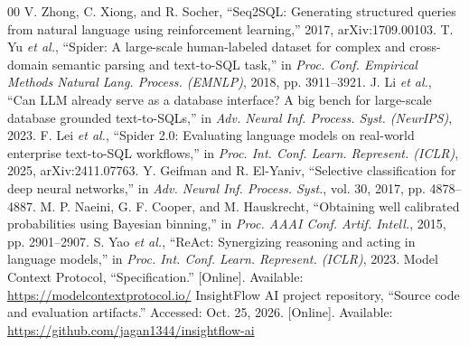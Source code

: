 \documentclass[conference]{IEEEtran}
\begin{document}
\begin{thebibliography}{00}
 V. Zhong, C. Xiong, and R. Socher, ``Seq2SQL: Generating structured queries from natural language using reinforcement learning,'' 2017, arXiv:1709.00103.
 T. Yu \emph{et al.}, ``Spider: A large-scale human-labeled dataset for complex and cross-domain semantic parsing and text-to-SQL task,'' in \emph{Proc. Conf. Empirical Methods Natural Lang. Process. (EMNLP)}, 2018, pp. 3911--3921.
 J. Li \emph{et al.}, ``Can LLM already serve as a database interface? A big bench for large-scale database grounded text-to-SQLs,'' in \emph{Adv. Neural Inf. Process. Syst. (NeurIPS)}, 2023.
 F. Lei \emph{et al.}, ``Spider 2.0: Evaluating language models on real-world enterprise text-to-SQL workflows,'' in \emph{Proc. Int. Conf. Learn. Represent. (ICLR)}, 2025, arXiv:2411.07763.
 Y. Geifman and R. El-Yaniv, ``Selective classification for deep neural networks,'' in \emph{Adv. Neural Inf. Process. Syst.}, vol. 30, 2017, pp. 4878--4887.
 M. P. Naeini, G. F. Cooper, and M. Hauskrecht, ``Obtaining well calibrated probabilities using Bayesian binning,'' in \emph{Proc. AAAI Conf. Artif. Intell.}, 2015, pp. 2901--2907.
 S. Yao \emph{et al.}, ``ReAct: Synergizing reasoning and acting in language models,'' in \emph{Proc. Int. Conf. Learn. Represent. (ICLR)}, 2023.
 Model Context Protocol, ``Specification.'' [Online]. Available: \url{https://modelcontextprotocol.io/}
 InsightFlow AI project repository, ``Source code and evaluation artifacts.'' Accessed: Oct. 25, 2026. [Online]. Available: \url{https://github.com/jagan1344/insightflow-ai}
\end{thebibliography}
\end{document}

